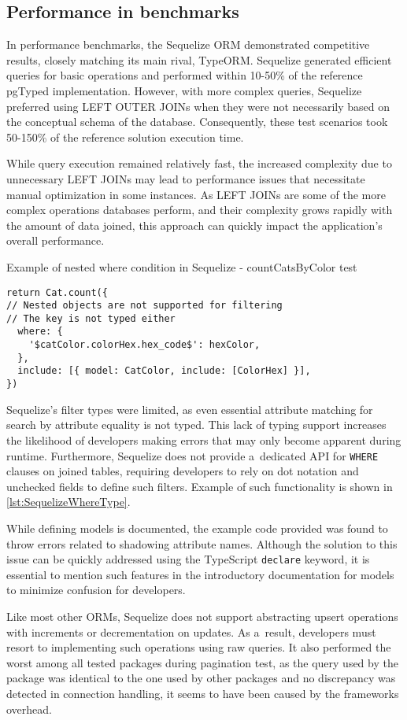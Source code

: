 \subsection*{Performance in benchmarks}

In performance benchmarks, the Sequelize ORM demonstrated competitive results,
closely matching its main rival, TypeORM. Sequelize generated efficient queries
for basic operations and performed within 10-50\% of the reference pgTyped
implementation. However, with more complex queries, Sequelize preferred using
LEFT OUTER JOINs when they were not necessarily based on the conceptual schema
of the database. Consequently, these test scenarios took 50-150\% of the
reference solution execution time.

While query execution remained relatively fast, the increased complexity due to
unnecessary LEFT JOINs may lead to performance issues that necessitate manual
optimization in some instances. As LEFT JOINs are some of the more complex
operations databases perform, and their complexity grows rapidly with the amount
of data joined, this approach can quickly impact the application's overall
performance.

\begin{listing}
    \caption{Example of nested where condition in Sequelize - countCatsByColor test}
    \label{lst:SequelizeWhereType}
\begin{verbatim}
return Cat.count({
// Nested objects are not supported for filtering
// The key is not typed either
  where: {
    '$catColor.colorHex.hex_code$': hexColor,
  },
  include: [{ model: CatColor, include: [ColorHex] }],
})
    \end{verbatim}
\end{listing}

Sequelize's filter types were limited, as even essential attribute matching for
search by attribute equality is not typed. This lack of typing support increases
the likelihood of developers making errors that may only become apparent during
runtime. Furthermore, Sequelize does not provide a~dedicated API for
\texttt{WHERE} clauses on joined tables, requiring developers to rely on dot
notation and unchecked fields to define such filters. Example of such
functionality is shown in \autoref{lst:SequelizeWhereType}.

While defining models is documented, the example code provided was found to
throw errors related to shadowing attribute names. Although the solution to this
issue can be quickly addressed using the TypeScript \texttt{declare} keyword, it is
essential to mention such features in the introductory documentation for models
to minimize confusion for developers.

Like most other ORMs, Sequelize does not support abstracting upsert operations
with increments or decrementation on updates. As a~result, developers must
resort to implementing such operations using raw queries. It also performed the
worst among all tested packages during pagination test, as the query used by the
package was identical to the one used by other packages and no discrepancy was
detected in connection handling, it seems to have been caused by the frameworks
overhead.
